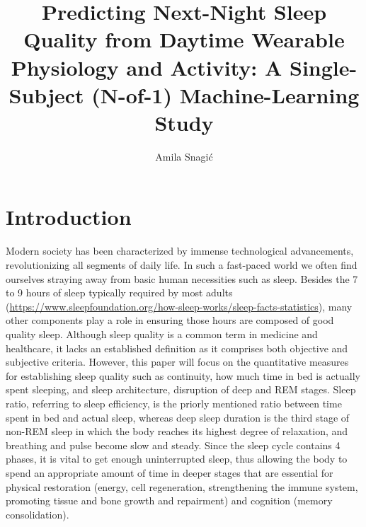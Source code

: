 \documentclass[fleqn,10pt]{wlscirep}
\title{Predicting Next-Night Sleep Quality from Daytime Wearable Physiology and Activity: A Single-Subject (N-of-1) Machine-Learning Study}
\author[1,*]{Amila Snagić}
\affil[1]{Faculty of Electrical Engineering (ETF), University of Sarajevo, Sarajevo, Bosnia and Herzegovina}
\affil[*]{asnagic1@etf.unsa.ba}
\begin{document}
\flushbottom
\maketitle
\thispagestyle{empty}

\section*{Introduction}

Modern society has been characterized by immense technological advancements, revolutionizing all segments of daily life. In such a fast-paced world we often find ourselves straying away from basic human necessities such as sleep. Besides the 7 to 9 hours of sleep typically required by most adults (\url{https://www.sleepfoundation.org/how-sleep-works/sleep-facts-statistics}), many other components play a role in ensuring those hours are composed of good quality sleep. Although sleep quality is a common term in medicine and healthcare, it lacks an established definition as it comprises both objective and subjective criteria. However, this paper will focus on the quantitative measures for establishing sleep quality such as continuity, how much time in bed is actually spent sleeping, and sleep architecture, disruption of deep and REM stages. Sleep ratio, referring to sleep efficiency, is the priorly mentioned ratio between time spent in bed and actual sleep, whereas deep sleep duration is the third stage of non-REM sleep in which the body reaches its highest degree of relaxation, and breathing and pulse become slow and steady. Since the sleep cycle contains 4 phases, it is vital to get enough uninterrupted sleep, thus allowing the body to spend an appropriate amount of time in deeper stages that are essential for physical restoration (energy, cell regeneration, strengthening the immune system, promoting tissue and bone growth and repairment) and cognition (memory consolidation).
\end{document}
